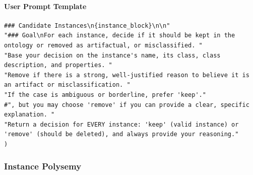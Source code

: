 \paragraph*{User Prompt Template}
\begin{verbatim}
### Candidate Instances\n{instance_block}\n\n"
"### Goal\nFor each instance, decide if it should be kept in the ontology or removed as artifactual, or misclassified. "
"Base your decision on the instance's name, its class, class description, and properties. "
"Remove if there is a strong, well-justified reason to believe it is an artifact or misclassification. "
"If the case is ambiguous or borderline, prefer 'keep'."
#", but you may choose 'remove' if you can provide a clear, specific explanation. "
"Return a decision for EVERY instance: 'keep' (valid instance) or 'remove' (should be deleted), and always provide your reasoning."
)
\end{verbatim}

\vspace{1em}

\subsubsection*{Instance Polysemy}

